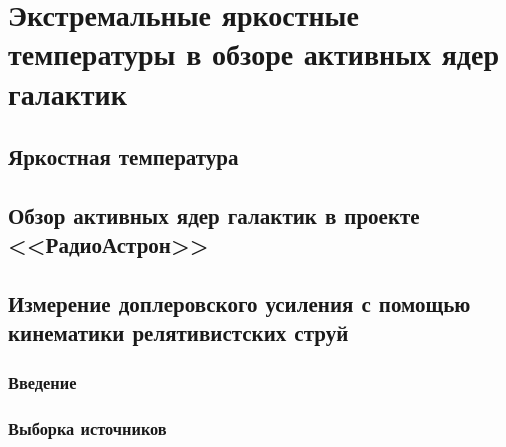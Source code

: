 \chapter{Экстремальные яркостные температуры в обзоре активных ядер галактик} \label{chapt3}

\section{Яркостная температура}

\section{Обзор активных ядер галактик в проекте <<РадиоАстрон>>}

\section{Измерение доплеровского усиления с помощью кинематики релятивистских струй}

\subsection{Введение}

\subsection{Выборка источников}

